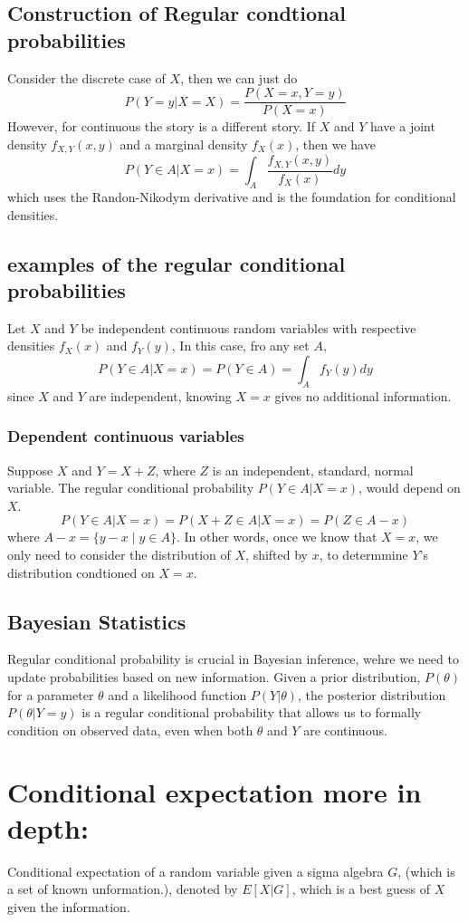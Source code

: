 \documentclass{article}
\begin{document}
\subsection{Construction of Regular condtional probabilities}
Consider the discrete case of $X$, then we can just do $$P(Y=y|X=X)=\frac{P(X=x, Y=y)}{P(X=x)}$$
However, for continuous the story is a different story. If $X$ and $Y$ have a joint density $f_{X,Y}(x,y)$ and a marginal density $f_X(x)$, then we have 
$$P(Y\in A| X=x)=\int_A \frac{f_{X,Y}(x,y)}{f_X(x)}dy$$
which uses the Randon-Nikodym derivative and is the foundation for conditional densities.
\subsection{examples of the regular conditional probabilities}
Let $X$ and $Y$ be independent continuous random variables with respective densities $f_X(x)$ and $f_Y(y)$, In this case, fro any set $A$,
$$P(Y\in A|X=x) = P(Y\in A)=\int_A f_Y(y) dy$$
since $X$ and $Y$ are independent, knowing $X=x$ gives no additional information.
\subsubsection{Dependent continuous variables}
Suppose $X$ and $Y=X+Z$, where $Z$ is an independent, standard, normal variable. The regular conditional probability $P(Y\in A| X=x)$, would depend on $X$.
$$P(Y\in A|X=x)=P(X+Z\in A|X=x) = P(Z\in A-x)$$
where $A-x=\{ y -x\mid y\in A\}$. In other words, once we know that $X=x$, we only need to consider the distribution of $X$, shifted by $x$, to determmine $Y$'s distribution condtioned on $X=x$.

\subsection{Bayesian Statistics}
Regular conditional probability is crucial in Bayesian inference, wehre we need to update probabilities based on new information. Given a prior distribution, $P(\theta)$ for a parameter $\theta$ and a likelihood function $P(Y|\theta)$, the posterior distribution $P(\theta | Y= y)$ is a regular conditional probability that allows us to formally condition on observed data, even when both $\theta$ and $Y$ are continuous. 


\section{Conditional expectation more in depth:}
Conditional expectation of a random variable given a sigma algebra $G$, (which is a set of known unformation.), denoted by $E[X|G]$, which is a best guess of $X$ given the information.
\end{document}
